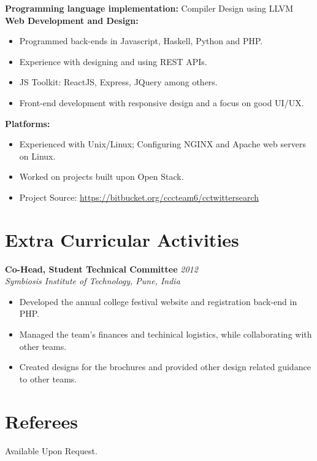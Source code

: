 \documentclass[a4paper,overlapped]{res}
\begin{document}
\begin{resume}
  \textbf{Programming language implementation:} Compiler Design using LLVM \\
  \textbf{Web Development and Design:}
  \begin{itemize}
  \item Programmed back-ends in Javascript, Haskell, Python and PHP.
  \item Experience with designing and using REST APIs.
  \item JS Toolkit: ReactJS, Express, JQuery among
    others.
  \item Front-end development with responsive design and a focus on good UI/UX.
  \end{itemize}
  \textbf{Platforms:}
  \begin{itemize}
  \item Experienced with Unix/Linux; Configuring NGINX and Apache web servers on
    Linux.
  \item Worked on projects built upon Open Stack.
  \item Project Source: \url{https://bitbucket.org/cccteam6/cctwittersearch}
  \end{itemize}


  
  \section{Extra Curricular Activities}  

  \textbf{Co-Head, Student Technical Committee}   \hfill \textit{2012} \\
  \textit{Symbiosis Institute of Technology, Pune, India}
  \begin{itemize}
  \item Developed the annual college festival website and registration back-end
    in PHP.
  \item Managed the team's finances and techinical logistics, while collaborating 
    with other teams.
  \item Created designs for the brochures and provided other design related guidance to
    other teams.
  \end{itemize}



  

  \section{Referees}
  Available Upon Request.

  
  
\end{resume}
\end{document}

